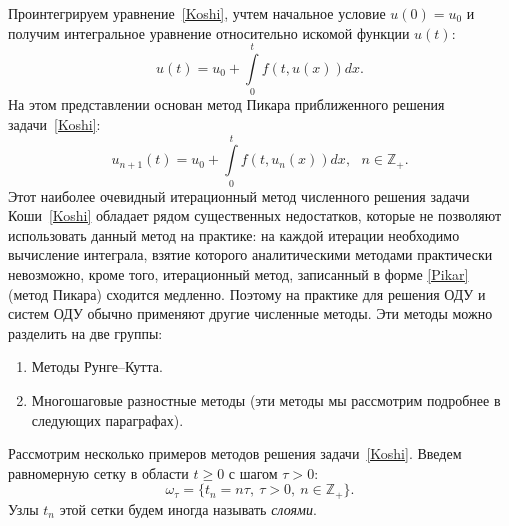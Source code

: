 \documentclass[11pt,a4paper,twoside,listtotoc,bibtotoc]{report}
\numberwithin{equation}{section}
\theoremstyle{definition}
\theoremstyle{plain}
\begin{document}
Проинтегрируем уравнение~\eqref{Koshi},
учтем начальное условие $u(0) = u_0$ и получим интегральное уравнение относительно
искомой функции $u(t)$:
%
$$
    u(t) = u_0 + \int \limits_0^t f(t, u(x))dx.
$$
%
На этом представлении основан метод Пикара приближенного решения
задачи~\eqref{Koshi}:
%
\begin{equation}
%
    \label{Pikar}
    u_{n+1}(t) = u_0 + \int \limits_0^t f(t, u_n(x))dx, ~~~n \in \mathbb{Z}_+.
%
\end{equation}
%
Этот наиболее очевидный итерационный метод численного решения задачи Коши~\eqref{Koshi}
обладает рядом существенных недостатков, которые не позволяют использовать
данный метод на практике: на каждой итерации необходимо вычисление интеграла,
взятие которого аналитическими методами практически невозможно, кроме того,
итерационный метод, записанный в форме \eqref{Pikar} (метод Пикара) сходится медленно.
Поэтому на практике для решения ОДУ и систем ОДУ обычно применяют другие численные методы.
Эти методы можно разделить на две группы:
%
\begin{enumerate}
%
    \item
        Методы Рунге--Кутта.
    \item
        Многошаговые разностные методы (эти методы мы рассмотрим подробнее в следующих
        параграфах).
%
\end{enumerate}
%
Рассмотрим несколько примеров методов решения задачи~\eqref{Koshi}.
Введем равномерную сетку в области $t\geqslant 0$ с шагом $\tau > 0$:
%
$$
    \omega_\tau=\{t_n=n\tau,~\tau > 0,~n\in\mathbb{Z}_+\}.
$$
%
Узлы $t_n$ этой сетки будем иногда называть {\it слоями}.
\end{document}
